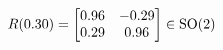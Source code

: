 \documentclass[preview]{standalone}
\begin{document}
\begin{align*}
\special{dvisvgm:raw <g id='unique000'>}R(0.30) = \begin{bmatrix} 0.96 & -0.29 \\ 0.29 & 0.96 \end{bmatrix} \in \text{SO}(2)\special{dvisvgm:raw </g>}
\end{align*}
\end{document}

